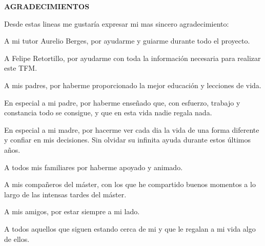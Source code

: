 \documentclass[spanish,12pt,a4paper,twoside,openright]{report}
\newcommand\blankpage{%
	\null
	\thispagestyle{empty}%
	\addtocounter{page}{-1}%
	\newpage}
\begin{document}

\begin{titlepage}

\begin{flushright}
{\large \bf AGRADECIMIENTOS}
\vspace{10pt}

{\normalsize Desde estas lineas me gustaría expresar mi mas sincero agradecimiento: \newline
	
A mi tutor Aurelio Berges, por ayudarme y guiarme durante todo el proyecto.
\newline

A Felipe Retortillo, por ayudarme con toda la información necesaria para realizar este TFM.
\newline

A mis padres, por haberme proporcionado la mejor educación y lecciones de vida.
\newline

En especial a mi padre, por haberme enseñado que, con esfuerzo, trabajo y constancia todo se consigue, y que en esta vida nadie regala nada.
\newline

En especial a mi madre, por hacerme ver cada dia la vida de una forma diferente y confiar en mis decisiones. Sin olvidar su infinita ayuda durante estos últimos años.
\newline

A todos mis familiares por haberme apoyado y animado.
\newline

A mis compañeros del máster, con los que he compartido buenos momentos a lo largo de las intensas tardes del máster.
\newline

A mis amigos, por estar siempre a mi lado.
\newline

A todos aquellos que siguen estando cerca de mi y que le regalan a mi vida algo de ellos.}
\end{flushright}
\end{titlepage}
\blankpage
\end{document}
